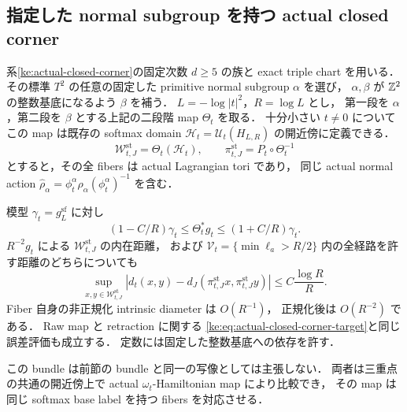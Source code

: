 \subsection{指定した normal subgroup を持つ actual closed corner}

\begin{corollary}
\label{ke:staged-closed-corner-gh}
系\ref{ke:actual-closed-corner}の固定次数 $d\ge5$ の族と exact triple chart を用いる．
その標準 $T^2$ の任意の固定した primitive normal subgroup $\alpha$ を選び，
$\alpha,\beta$ が $\mathbb Z^2$ の整数基底になるよう $\beta$ を補う．
$L=-\log|t|^2$，$R=\log L$ とし，
第一段を $\alpha$，第二段を $\beta$ とする上記の二段階 map $\Theta_t$ を取る．
十分小さい $t\ne0$ についてこの map は既存の softmax domain
$\mathcal H_t=\mathcal U_t(H_{L,R})$ の開近傍に定義できる．
\[
 \mathcal W_{t,J}^{\mathrm{st}}=\Theta_t(\mathcal H_t),\qquad
 \pi_{t,J}^{\mathrm{st}}=P_t\circ\Theta_t^{-1}
\]
とすると，その全 fibers は actual Lagrangian tori であり，
同じ actual normal action
$\widehat\rho_\alpha=\phi_t^\alpha\rho_\alpha(\phi_t^\alpha)^{-1}$ を含む．

模型 $\gamma_t=g_L^{\mathrm{sf}}$ に対し
\begin{equation}\label{ke:eq:staged-actual-metric}
 (1-C/R)\gamma_t\le\Theta_t^*g_t\le(1+C/R)\gamma_t.
\end{equation}
$R^{-2}g_t$ による $\mathcal W_{t,J}^{\mathrm{st}}$ の内在距離，
および $\mathcal V_t=\{\min\ell_a>R/2\}$ 内の全経路を許す距離のどちらについても
\begin{equation}\label{ke:eq:staged-closed-distortion}
 \sup_{x,y\in\mathcal W_{t,J}^{\mathrm{st}}}
 \left|d_t(x,y)-d_J(\pi_{t,J}^{\mathrm{st}}x,\pi_{t,J}^{\mathrm{st}}y)\right|
 \le C\frac{\log R}{R}.
\end{equation}
Fiber 自身の非正規化 intrinsic diameter は $O(R^{-1})$，
正規化後は $O(R^{-2})$ である．
Raw map と retraction に関する
\eqref{ke:eq:actual-closed-corner-target}と同じ誤差評価も成立する．
定数には固定した整数基底への依存を許す．

この bundle は前節の bundle と同一の写像としては主張しない．
両者は三重点の共通の開近傍上で actual $\omega_t$-Hamiltonian map により比較でき，
その map は同じ softmax base label を持つ fibers を対応させる．
\end{corollary}

